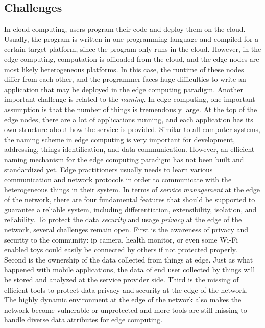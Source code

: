 \subsection{Challenges}
In cloud computing, users program their code and deploy them on the cloud. Usually, the program is written in one programming language and compiled for a certain target platform, since the program only runs in the cloud. However, in the edge computing, computation is offloaded from the cloud, and the edge nodes are most likely heterogeneous platforms. In this case, the runtime of these nodes differ from each other, and the programmer faces huge difficulties to write an application that may be deployed in the edge computing paradigm.
Another important challenge is related to the \textit{naming}. In edge computing, one important assumption is that the number of things is tremendously large. At the top of the edge nodes, there are a lot of applications running, and each application has its own structure about how the service is provided. Similar to all computer systems, the naming scheme in edge computing is very important for development, addressing, things identification, and data communication. However, an efficient naming mechanism for the edge computing paradigm has not been built and standardized yet. Edge practitioners usually needs to learn various communication and network protocols in order to communicate with the heterogeneous things in their system.
In terms of \textit{service management} at the edge of the network, there are four fundamental features that should be supported to guarantee a reliable system, including differentiation, extensibility, isolation, and reliability.  
To protect the data \textit{security} and usage \textit{privacy} at the edge of the network, several challenges remain open. First is the awareness of privacy and security to the community: ip camera, health monitor, or even some Wi-Fi enabled toys could easily be connected by others if not protected properly. Second is the ownership of the data collected from things at edge. Just as what happened with mobile applications, the data of end user collected by things will be stored and analyzed at the service provider side. Third is the missing of efficient tools to protect data privacy and security at the edge of the network. The highly dynamic environment at the edge of the network also makes the network become vulnerable or unprotected and more tools are still missing to handle diverse data attributes for edge computing.


